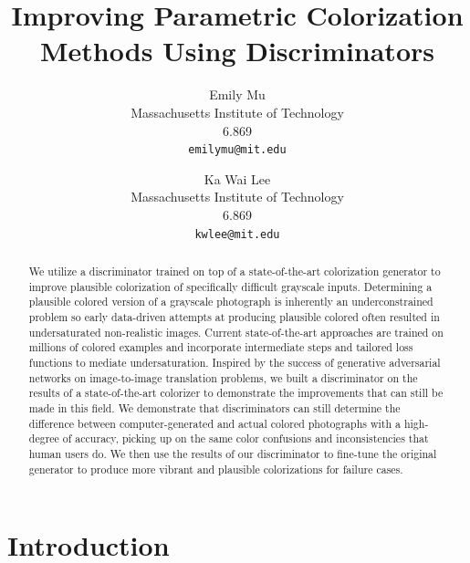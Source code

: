 \documentclass[10pt,twocolumn,letterpaper]{article}
\begin{document}
\title{Improving Parametric Colorization Methods Using Discriminators }

\author{Emily Mu\\
Massachusetts Institute of Technology\\
6.869\\
{\tt\small emilymu@mit.edu}
\and
Ka Wai Lee\\
Massachusetts Institute of Technology\\
6.869\\
{\tt\small kwlee@mit.edu}
}

\maketitle

\begin{abstract}
We utilize a discriminator trained on top of a state-of-the-art colorization generator to improve plausible colorization of specifically difficult grayscale inputs. Determining a plausible colored version of a grayscale photograph is inherently an underconstrained problem so early data-driven attempts at producing plausible colored often resulted in undersaturated non-realistic images. Current state-of-the-art approaches are trained on millions of colored examples and incorporate intermediate steps and tailored loss functions to mediate undersaturation. Inspired by the success of generative adversarial networks on image-to-image translation problems, we built a discriminator on the results of a state-of-the-art colorizer to demonstrate the improvements that can still be made in this field. We demonstrate that discriminators can still determine the difference between computer-generated and actual colored photographs with a high-degree of accuracy, picking up on the same color confusions and inconsistencies that human users do. We then use the results of our discriminator to fine-tune the original generator to produce more vibrant and plausible colorizations for failure cases. 
\end{abstract}

\section{Introduction}
\end{document}
